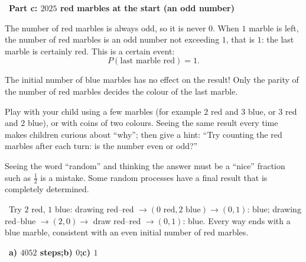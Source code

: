 \documentclass[11pt]{article}
\providecommand{\AnsWord}{Đáp số}
\newcommand{\ans}[1]{\par\smallskip{\bfseries\color{tmGreen!88!black}\AnsWord:}\ {\bfseries\color{AnsRed}#1}\par}
\newcommand{\step}[2]{\par\smallskip\noindent{\bfseries\color{tmBlue!85!black}\StepWord~#1.}\ {\bfseries #2}\par\nopagebreak}
\newcommand{\verify}[1]{\par\smallskip\noindent{\bfseries\color{tmGreen!80!black}\faCheckCircle\ \CheckWord}\ #1\par}
\def\AnsWord{Answer}
\def\StepWord{Step}
\def\CheckWord{Check:}
\begin{document}
{\step{4}{Part c: $2025$ red marbles at the start (an odd number)}
The number of red marbles is always odd, so it is never $0$. When $1$ marble is left, the number of red marbles is an odd number not exceeding
$1$, that is $1$: the last marble is certainly red. This is a certain event:
\[P(\text{last marble red})=1.\]
\begin{tipbox}The initial number of blue marbles has no effect on the result! Only the parity of the number of red marbles decides the colour
of the last marble.\end{tipbox}
\begin{parentbox}Play with your child using a few marbles (for example $2$ red and $3$ blue, or $3$ red and $2$ blue), or with coins of two
colours. Seeing the same result every time makes children curious about ``why''; then give a hint: ``Try counting the red marbles after each
turn: is the number even or odd?''\end{parentbox}
\begin{warnbox}Seeing the word ``random'' and thinking the answer must be a ``nice'' fraction such as $\frac12$ is a mistake. Some random
processes have a final result that is completely determined.\end{warnbox}
\verify{Try $2$ red, $1$ blue: drawing red--red $\to(0\text{ red},2\text{ blue})\to(0,1)$: blue; drawing red--blue $\to(2,0)\to$ draw
red--red $\to(0,1)$: blue. Every way ends with a blue marble, consistent with an even initial number of red marbles.}
\ans{a) $4052$ steps;\quad b) $0$;\quad c) $1$}
}
\end{document}
